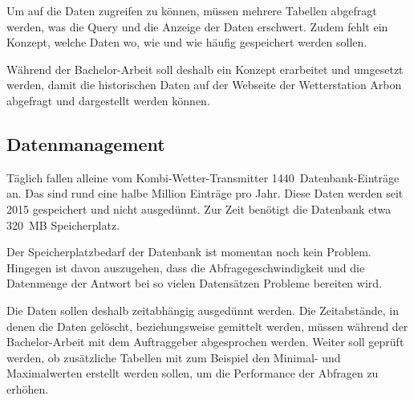 \noindent
Um auf die Daten zugreifen zu können, müssen mehrere Tabellen abgefragt werden, was die Query und die Anzeige der Daten erschwert. Zudem fehlt ein Konzept, welche Daten wo, wie und wie häufig gespeichert werden sollen.
\newline

\noindent
Während der Bachelor-Arbeit soll deshalb ein Konzept erarbeitet und umgesetzt werden, damit die historischen Daten auf der Webseite der Wetterstation Arbon abgefragt und dargestellt werden können.


\subsection{Datenmanagement}
Täglich fallen alleine vom Kombi-Wetter-Transmitter 1440~Datenbank-Einträge an. Das sind rund eine halbe Million Einträge pro Jahr. Diese Daten werden seit 2015 gespeichert und nicht ausgedünnt. Zur Zeit benötigt die Datenbank etwa 320~MB Speicherplatz.
\newline

\noindent
Der Speicherplatzbedarf der Datenbank ist momentan noch kein Problem. Hingegen ist davon auszugehen, dass die Abfragegeschwindigkeit und die Datenmenge der Antwort bei so vielen Datensätzen Probleme bereiten wird.
\newline

\noindent
Die Daten sollen deshalb zeitabhängig ausgedünnt werden. Die Zeitabstände, in denen die Daten gelöscht, beziehungsweise gemittelt werden, müssen während der Bachelor-Arbeit mit dem Auftraggeber abgesprochen werden. Weiter soll geprüft werden, ob zusätzliche Tabellen mit zum Beispiel den Minimal- und Maximalwerten erstellt werden sollen, um die Performance der Abfragen zu erhöhen.


